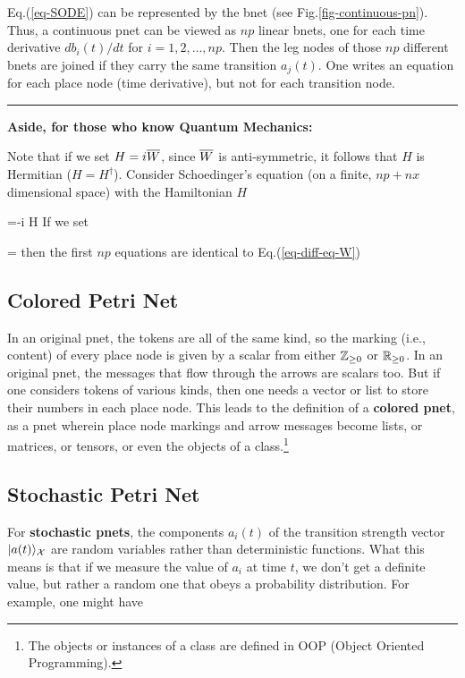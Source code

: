 Eq.(\ref{eq-SODE})
can be represented by 
 the bnet (see Fig.\ref{fig-continuous-pn}).
Thus, a continuous pnet can be 
viewed as $np$ linear bnets,
one for each 
time derivative $db_i(t)/dt$
for $i=1,2, \ldots, np$. Then
the leg nodes of those $np$
different bnets are joined 
if they carry the same transition $a_j(t)$.
One writes an equation 
for each place node (time derivative),
but not for each transition node.
\hrule
{\bf Aside, for those who know Quantum Mechanics:}

Note that if we set $H = i\overline{W}$,
since $\overline{W}$ is anti-symmetric,
it follows that  $H$ is Hermitian ($H=H^\dagger$). Consider Schoedinger's equation 
(on a finite, $np+nx$ dimensional space)
with the Hamiltonian $H$

\beq
{} =-i H 
\eeq 
If we set

\beq
{} =
\eeq
then the first $np$ equations are identical to Eq.(\ref{eq-diff-eq-W})





\subsection{Colored Petri Net}
In an original pnet, the tokens
are all of the same kind,
so the marking (i.e., content)
of every place node is given by a scalar
from either ${\mathbb{Z}}_{\geq 0}$
or ${ \mathbb{R}}_{\geq 0}$.
In an original pnet,
the messages that flow through the arrows
are scalars too.
But if one considers
tokens of various kinds,
then one needs a vector or list  to
store their numbers in each place node.
This leads
to the definition of a {\bf colored pnet},
as a pnet wherein
place node markings
and arrow messages become lists, or matrices, or  tensors,
or even
the objects of 
a class.\footnote{The objects
or instances 
of a class are defined in OOP (Object Oriented Programming).}


\subsection{Stochastic Petri Net}
For {\bf stochastic pnets},
the components $a_i(t)$ of the transition strength vector $|a(t)\rangle_{\cal X}$  are random variables rather than deterministic functions.
What this means is that if we measure the value of $a_i$ at time $t$,
we don't get a definite value, but rather a random one that obeys a probability distribution. For example, one might have


